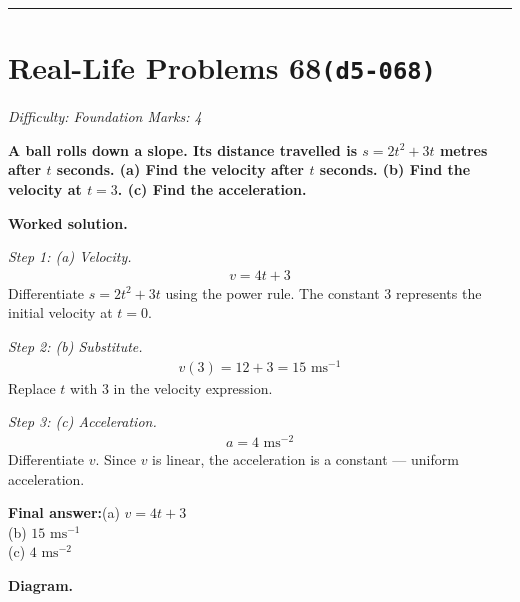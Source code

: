 \documentclass[11pt]{article}
\newcommand{\question}[1]{\par\medskip\noindent\textbf{#1}\par}
\begin{document}
\medskip\hrule

\section*{Real-Life Problems 68\quad\small\texttt{(d5-068)}}
\textit{Difficulty: Foundation \quad\textbar\quad Marks: 4}

\question{A ball rolls down a slope. Its distance travelled is \( s = 2t^2 + 3t \) metres after \( t \) seconds. (a) Find the velocity after \( t \) seconds. (b) Find the velocity at \( t = 3 \). (c) Find the acceleration.}

\textbf{Worked solution.}

\textit{Step 1: (a) Velocity.}
\[\begin{gathered}
v = 4t + 3
\end{gathered}\]
Differentiate \( s = 2t^2 + 3t \) using the power rule. The constant 3 represents the initial velocity at \( t = 0 \).

\textit{Step 2: (b) Substitute.}
\[\begin{gathered}
v(3) = 12 + 3 = 15 \text{ ms}^{-1}
\end{gathered}\]
Replace \( t \) with 3 in the velocity expression.

\textit{Step 3: (c) Acceleration.}
\[\begin{gathered}
a = 4 \text{ ms}^{-2}
\end{gathered}\]
Differentiate \( v \). Since \( v \) is linear, the acceleration is a constant --- uniform acceleration.

\begin{answerbox}
\textbf{Final answer:}\quad (a) \(\displaystyle  v = 4t + 3 \) \\[3pt]  (b) \(\displaystyle  15 \text{ ms}^{-1} \) \\[3pt]  (c) \(\displaystyle  4 \text{ ms}^{-2} \)
\end{answerbox}
\textbf{Diagram.}
\end{document}
